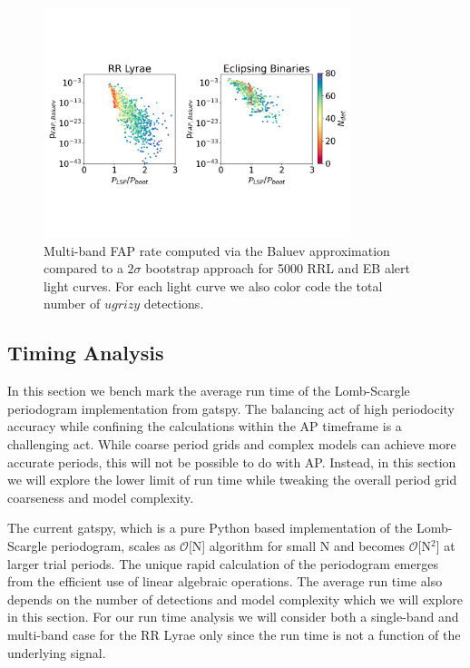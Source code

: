 \documentclass[DM,authoryear,toc]{lsstdoc}
\begin{document}
\begin{figure}
  \includegraphics[width=0.8\textwidth]{figures/fap_approximation_mlsp.pdf}
  \centering 
  \caption{Multi-band FAP rate computed via the Baluev approximation compared to a $2\sigma$ bootstrap approach for 5000 RRL and EB alert light curves. For each light curve we also color code the total number of $ugrizy$ detections.}
\end{figure}



\subsection{Timing Analysis}

In this section we bench mark the average run time of the Lomb-Scargle periodogram implementation from gatspy. The balancing act of high periodocity accuracy while confining the calculations within the AP timeframe is a challenging act. While coarse period grids  and complex models can achieve more accurate periods, this will not be possible to do with AP. Instead, in this section we will explore the lower limit of run time while tweaking the overall period grid coarseness and model complexity.

The current gatspy, which is a pure Python based implementation of the Lomb-Scargle periodogram, scales as  $\mathcal{O}$[N] algorithm for small N and becomes $\mathcal{O}$[N$^2$] at larger trial periods. The unique rapid calculation of the periodogram emerges from the efficient use of linear algebraic operations. The average run time also depends on the number of detections and model complexity which we will explore in this section. For our run time analysis we will consider both a single-band and multi-band case for the RR Lyrae only since the run time is not a function of the underlying signal. 
\end{document}
